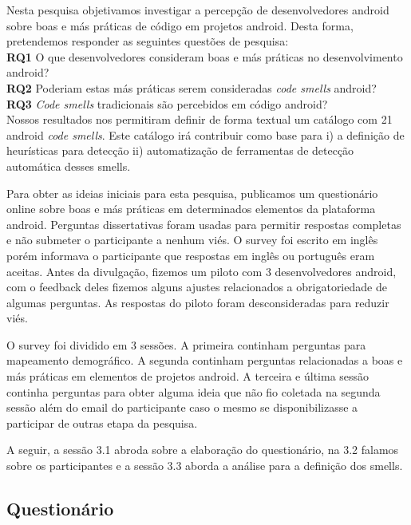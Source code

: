Nesta pesquisa objetivamos investigar a percep\c{c}\~ao de desenvolvedores android sobre boas e m\'as pr\'aticas de c\'odigo em projetos android. Desta forma, pretendemos responder as seguintes quest\~oes de pesquisa: \\

\textbf{RQ1} O que desenvolvedores consideram boas e m\'as pr\'aticas no desenvolvimento android? \\

\textbf{RQ2} Poderiam estas m\'as pr\'aticas serem consideradas \textit{code smells} android? \\

\textbf{RQ3} \textit{Code smells} tradicionais s\~ao percebidos em c\'odigo android? \\

Nossos resultados nos permitiram definir de forma textual um cat\'alogo com 21 android \textit{code smells}. Este cat\'alogo ir\'a contribuir como base para i) a defini\c{c}\~ao de heur\'isticas para detec\c{c}\~ao ii) automatiza\c{c}\~ao de ferramentas de detec\c{c}\~ao autom\'atica desses smells.

Para obter as ideias iniciais para esta pesquisa, publicamos um question\'ario online sobre boas e m\'as pr\'aticas em determinados elementos da plataforma android. Perguntas dissertativas foram usadas para permitir respostas completas e n\~ao submeter o participante a nenhum vi\'es. O survey foi escrito em ingl\^es por\'em informava o participante que respostas em ingl\^es ou portugu\^es eram aceitas. Antes da divulga\c{c}\~ao, fizemos um piloto com 3 desenvolvedores android, com o feedback deles fizemos alguns ajustes relacionados a obrigatoriedade de algumas perguntas. As respostas do piloto foram desconsideradas para reduzir vi\'es. 

O survey foi dividido em 3 sess\~oes. A primeira continham perguntas para mapeamento demogr\'afico. A segunda continham perguntas relacionadas a boas e m\'as pr\'aticas em elementos de projetos android. A terceira e \'ultima sess\~ao continha perguntas para obter alguma ideia que n\~ao fio coletada na segunda sess\~ao al\'em do email do participante caso o mesmo se disponibilizasse a participar de outras etapa da pesquisa. 

A seguir, a sess\~ao 3.1 abroda sobre a elabora\c{c}\~ao do question\'ario, na 3.2 falamos sobre os participantes e a sess\~ao 3.3 aborda a an\'alise para a defini\c{c}\~ao dos smells.

\subsection{Question\'ario}

